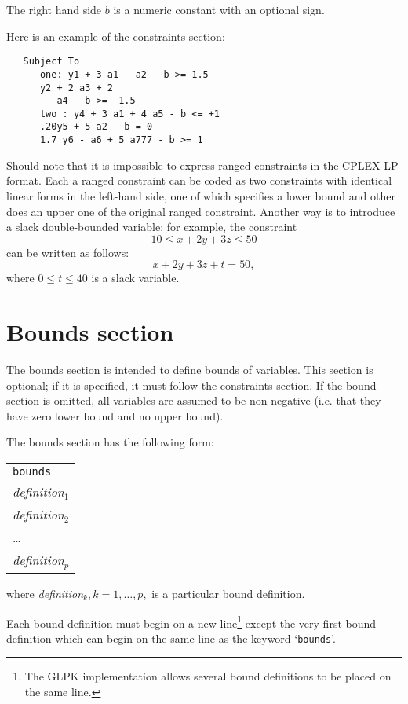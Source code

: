 The right hand side $b$ is a numeric constant with an optional sign.

Here is an example of the constraints section:

\begin{verbatim}
   Subject To
      one: y1 + 3 a1 - a2 - b >= 1.5
      y2 + 2 a3 + 2
         a4 - b >= -1.5
      two : y4 + 3 a1 + 4 a5 - b <= +1
      .20y5 + 5 a2 - b = 0
      1.7 y6 - a6 + 5 a777 - b >= 1
\end{verbatim}

Should note that it is impossible to express ranged constraints in the
CPLEX LP format. Each a ranged constraint can be coded as two
constraints with identical linear forms in the left-hand side, one of
which specifies a lower bound and other does an upper one of the
original ranged constraint. Another way is to introduce a slack
double-bounded variable; for example, the
constraint
$$10\leq x+2y+3z\leq 50$$
can be written as follows:
$$x+2y+3z+t=50,$$
where $0\leq t\leq 40$ is a slack variable.

\section{Bounds section}

The bounds section is intended to define bounds of variables. This
section is optional; if it is specified, it must follow the constraints
section. If the bound section is omitted, all variables are assumed to
be non-negative (i.e. that they have zero lower bound and no upper
bound).

The bounds section has the following form:

\begin{center}
\begin{tabular}{l}
\verb|bounds| \\
{\it definition}$_1$ \\
{\it definition}$_2$ \\
\hspace{20pt}\dots \\
{\it definition}$_p$ \\
\end{tabular}
\end{center}

\noindent
where {\it definition}$_k, k=1,\dots,p,$ is a particular bound
definition.

Each bound definition must begin on a new line\footnote{The GLPK
implementation allows several bound definitions to be placed on the
same line.} except the very first bound definition which can begin on
the same line as the keyword `\verb|bounds|'.

